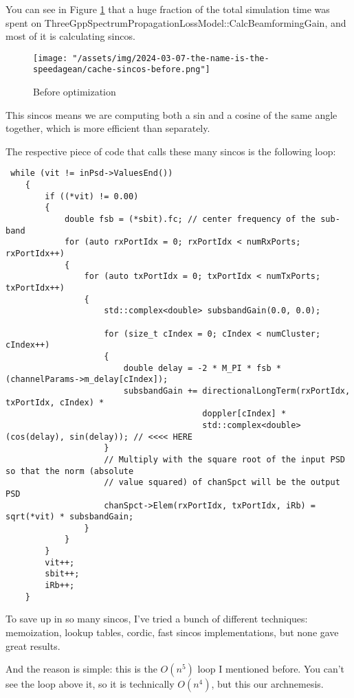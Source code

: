 \documentclass{article}
\begin{document}
You can see in Figure \ref{fig:cache-sincos-before} that a huge fraction of the
total simulation time was spent on ThreeGppSpectrumPropagationLossModel::CalcBeamformingGain,
and most of it is calculating sincos.

\begin{figure}
    \texttt{[image: "/assets/img/2024-03-07-the-name-is-the-speedagean/cache-sincos-before.png"]}
    \caption{Before optimization}
    \label{fig:cache-sincos-before}
\end{figure}

This sincos means we are computing both a sin and a cosine of the same angle together,
which is more efficient than separately.

The respective piece of code that calls these many sincos is the following loop:

\begin{lstlisting}
 while (vit != inPsd->ValuesEnd())
    {
        if ((*vit) != 0.00)
        {
            double fsb = (*sbit).fc; // center frequency of the sub-band
            for (auto rxPortIdx = 0; rxPortIdx < numRxPorts; rxPortIdx++)
            {
                for (auto txPortIdx = 0; txPortIdx < numTxPorts; txPortIdx++)
                {
                    std::complex<double> subsbandGain(0.0, 0.0);

                    for (size_t cIndex = 0; cIndex < numCluster; cIndex++)
                    {
                        double delay = -2 * M_PI * fsb * (channelParams->m_delay[cIndex]);
                        subsbandGain += directionalLongTerm(rxPortIdx, txPortIdx, cIndex) *
                                        doppler[cIndex] *
                                        std::complex<double>(cos(delay), sin(delay)); // <<<< HERE
                    }
                    // Multiply with the square root of the input PSD so that the norm (absolute
                    // value squared) of chanSpct will be the output PSD
                    chanSpct->Elem(rxPortIdx, txPortIdx, iRb) = sqrt(*vit) * subsbandGain;
                }
            }
        }
        vit++;
        sbit++;
        iRb++;
    }
\end{lstlisting}

To save up in so many sincos, I've tried a bunch of different techniques:
memoization, lookup tables, cordic, fast sincos implementations, but none
gave great results.

And the reason is simple: this is the $O(n^5)$ loop I mentioned before.
You can't see the loop above it, so it is technically $O(n^4)$, but this
our archnemesis.
\end{document}
